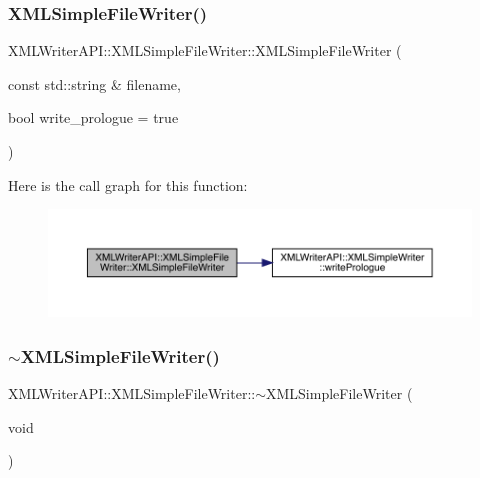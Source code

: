 \subsubsection{\texorpdfstring{XMLSimpleFileWriter()}{XMLSimpleFileWriter()}\hspace{0.1cm}{\footnotesize\ttfamily [1/3]}}
{\footnotesize\ttfamily X\+M\+L\+Writer\+A\+P\+I\+::\+X\+M\+L\+Simple\+File\+Writer\+::\+X\+M\+L\+Simple\+File\+Writer (\begin{DoxyParamCaption}\item[{const std\+::string \&}]{filename,  }\item[{bool}]{write\+\_\+prologue = {\ttfamily true} }\end{DoxyParamCaption})\hspace{0.3cm}{\ttfamily [inline]}}

Here is the call graph for this function\+:
\nopagebreak
\begin{figure}[H]
\begin{center}
\leavevmode
\includegraphics[width=350pt]{d2/de2/classXMLWriterAPI_1_1XMLSimpleFileWriter_a8ce4f6691f7e2e803a14e0cba906a4b7_cgraph}
\end{center}
\end{figure}
\mbox{\label{classXMLWriterAPI_1_1XMLSimpleFileWriter_a8a18cf3ea74f63a4f84a434237109e68}} 
\subsubsection{\texorpdfstring{$\sim$XMLSimpleFileWriter()}{~XMLSimpleFileWriter()}\hspace{0.1cm}{\footnotesize\ttfamily [1/3]}}
{\footnotesize\ttfamily X\+M\+L\+Writer\+A\+P\+I\+::\+X\+M\+L\+Simple\+File\+Writer\+::$\sim$\+X\+M\+L\+Simple\+File\+Writer (\begin{DoxyParamCaption}\item[{void}]{ }\end{DoxyParamCaption})\hspace{0.3cm}{\ttfamily [inline]}}

